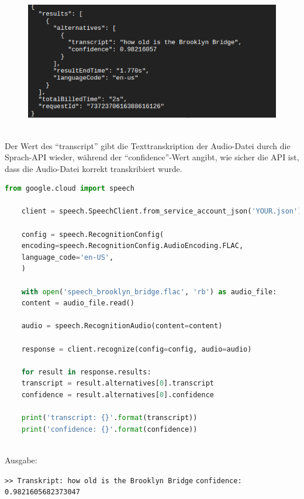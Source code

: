 \documentclass[12pt,a4paper]{article}
\begin{document}
\begin{figure}[h!]
	\centering
	\includegraphics[width=1\linewidth]{../images/ergebnisse}
	\label{fig:ergebnisse}
\end{figure}
\ \\
Der Wert des \enquote{transcript} gibt die Texttranskription der Audio-Datei durch die Sprach-API wieder, während der \enquote{confidence}-Wert angibt, wie sicher die API ist, dass die Audio-Datei korrekt transkribiert wurde. 
\newpage
\begin{lstlisting}[language=Python,numbers = none]
	from google.cloud import speech
	
	client = speech.SpeechClient.from_service_account_json('YOUR.json')
	
	config = speech.RecognitionConfig(
	encoding=speech.RecognitionConfig.AudioEncoding.FLAC,
	language_code='en-US',   
	)
	
	with open('speech_brooklyn_bridge.flac', 'rb') as audio_file:
	content = audio_file.read()
	
	audio = speech.RecognitionAudio(content=content)
	
	response = client.recognize(config=config, audio=audio)
	
	for result in response.results:
	transcript = result.alternatives[0].transcript
	confidence = result.alternatives[0].confidence
	
	print('transcript: {}'.format(transcript))
	print('confidence: {}'.format(confidence))
\end{lstlisting}
\ \\
Ausgabe: 
\begin{center}
	\verb|>> Transkript: how old is the Brooklyn Bridge| 
	\verb|confidence: 0.9821605682373047|
\end{center}

\end{document}
